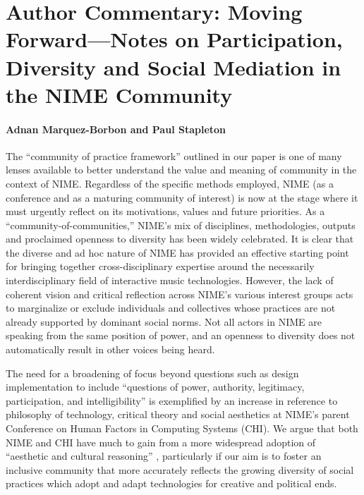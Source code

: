 \section*{Author Commentary: Moving Forward---Notes on Participation, Diversity and Social Mediation in the NIME Community}
\paragraph{Adnan Marquez-Borbon and Paul Stapleton}

The ``community of practice framework'' outlined in our paper is one of many lenses available to better understand the value and meaning of community in the context of NIME. Regardless of the specific methods employed, NIME (as a conference and as a maturing community of interest) is now at the stage where it must urgently reflect on its motivations, values and future priorities. As a ``community-of-communities,'' NIME's mix of disciplines, methodologies, outputs and proclaimed openness to diversity has been widely celebrated. It is clear that the diverse and ad hoc nature of NIME has provided an effective starting point for bringing together cross-disciplinary expertise around the necessarily interdisciplinary field of interactive music technologies. However, the lack of coherent vision and critical reflection across NIME's various interest groups acts to marginalize or exclude individuals and collectives whose practices are not already supported by dominant social norms. Not all actors in NIME are speaking from the same position of power, and an openness to diversity does not automatically result in other voices being heard.

The need for a broadening of focus beyond questions such as design implementation to include ``questions of power, authority, legitimacy, participation, and intelligibility'' \cite{Irani:2010} is exemplified by an increase in reference to philosophy of technology, critical theory and social aesthetics at NIME's parent Conference on Human Factors in Computing Systems (CHI). We argue that both NIME and CHI have much to gain from a more widespread adoption of ``aesthetic and cultural reasoning'' \cite{Bardzell:2009}, particularly if our aim is to foster an inclusive community that more accurately reflects the growing diversity of social practices which adopt and adapt technologies for creative and political ends. 

